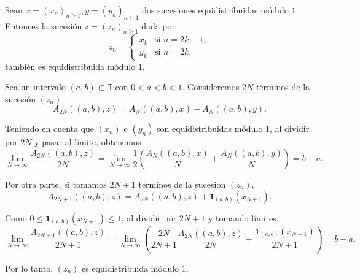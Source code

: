 \begin{example}
    Sean $x=(x_n)_{n\geq1}, y=(y_n)_{n\geq1}$ dos sucesiones equidistribuidas módulo $1$.
    Entonces la sucesión $z=(z_n)_{n\geq1}$ dada por
    \[
        z_n = \begin{cases}
            x_k & \text{si } n = 2k-1,\\
            y_k & \text{si } n = 2k,
        \end{cases}
    \]
    también es equidistribuida módulo $1$.
\end{example}

\begin{resolve}
    Sea un intervalo $(a,b)\subset \mathbb{T}$ con $0<a<b<1$. Consideremos $2N$ términos de la sucesión $(z_n)$, 
    \[
        A_{2N}((a,b), z) = A_N((a,b), x) + A_N((a,b), y).
    \]
    
    Teniendo en cuenta que $(x_n)$ e $(y_n)$ son equidistribuidas módulo $1$, al dividir por $2N$
    y pasar al límite, obtenemos
    \[
        \lim_{N \to \infty} \frac{A_{2N}((a,b), z)}{2N} =
        \lim_{N \to \infty} \frac{1}{2} \left( \frac{A_N((a,b), x)}{N} + \frac{A_N((a,b), y)}{N} \right) =
        b-a.
    \]
    
    Por otra parte, si tomamos $2N+1$ términos de la sucesión $(z_n)$, 
    \[
        A_{2N+1}((a,b), z) = A_{2N}((a,b), z) + \mathbf{1}_{(a,b)}(x_{N+1}).
    \]

    Como $0 \leq \mathbf{1}_{(a,b)}(x_{N+1}) \leq 1$, al dividir por $2N+1$ y tomando límites,
    \[
        \lim_{N \to \infty} \frac{A_{2N+1}((a,b), z)}{2N+1} =
        \lim_{N \to \infty} \left(\frac{2N}{2N+1} \frac{A_{2N}((a,b), z)}{2N} + \frac{\mathbf{1}_{(a,b)}(x_{N+1})}{2N+1} \right) =  
        b-a.
    \]

    Por lo tanto, $(z_n)$ es equidistribuida módulo $1$.  
\end{resolve}
